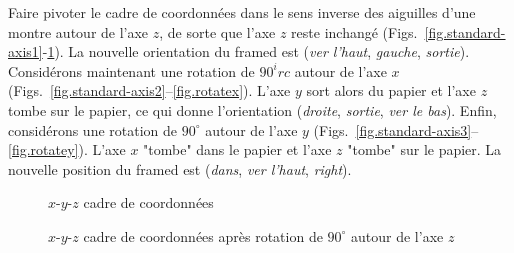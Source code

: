 Faire pivoter le cadre de coordonnées dans le sens inverse des aiguilles d'une montre autour de l'axe $z$, de sorte que l'axe $z$ reste inchangé (Figs.~\ref{fig.standard-axis1}-\ref{fig.rotatez}). La nouvelle orientation du framed est (\textit{ver l'haut}, \textit{gauche}, \textit{sortie}). Considérons maintenant une rotation de $90^irc$ autour de l'axe $x$ (Figs.~\ref{fig.standard-axis2}--\ref{fig.rotatex}). L'axe $y$ sort alors du papier et l'axe $z$ tombe sur le papier, ce qui donne l'orientation (\textit{droite}, \textit{sortie}, \textit{ver le bas}). Enfin, considérons une rotation de $90^\circ$ autour de l'axe $y$ (Figs.~\ref{fig.standard-axis3}--\ref{fig.rotatey}). L'axe $x$ "tombe" dans le papier et l'axe $z$ "tombe" sur le papier. La nouvelle position du framed est (\textit{dans}, \textit{ver l'haut}, \textit{right}).

\begin{figure}
\begin{minipage}{.48\textwidth}
\caption{$x$-$y$-$z$ cadre de coordonnées}\label{fig.standard-axis1}
\end{minipage}
\hspace{\fill}
\begin{minipage}{.48\textwidth}
\caption{$x$-$y$-$z$ cadre de coordonnées après rotation de $90^\circ$ autour de l'axe $z$}\label{fig.rotatez}
\end{minipage}
\end{figure}


